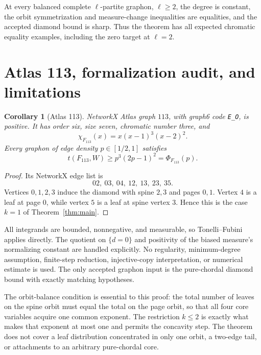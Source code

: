 \documentclass[11pt]{article}
\newtheorem{corollary}[theorem]{Corollary}
\begin{document}
At every balanced complete $\ell$-partite graphon, $\ell\geq2$, the degree
is constant, the orbit symmetrization and measure-change inequalities are
equalities, and the accepted diamond bound is sharp.  Thus the theorem has
all expected chromatic equality examples, including the zero target at
$\ell=2$.


\section{Atlas 113, formalization audit, and limitations}

\begin{corollary}[Atlas 113]
NetworkX Atlas graph $113$, with graph6 code \texttt{E\_O}, is
positive.  It has order six, size seven, chromatic number three, and
\[
 \chi_{F_{113}}(x)=x(x-1)^3(x-2)^2.
\]
Every graphon of edge density $p\in[1/2,1]$ satisfies
\[
 t(F_{113},W)\geq p^3(2p-1)^2=\Phi_{F_{113}}(p).
\]
\end{corollary}

\begin{proof}
Its NetworkX edge list is
\[
 02,\ 03,\ 04,\ 12,\ 13,\ 23,\ 35.
\]
Vertices $0,1,2,3$ induce the diamond with spine $2,3$ and pages $0,1$.
Vertex $4$ is a leaf at page $0$, while vertex $5$ is a leaf at spine
vertex $3$.  Hence this is the case $k=1$ of Theorem~\ref{thm:main}.
\end{proof}

All integrands are bounded, nonnegative, and measurable, so Tonelli--Fubini
applies directly.  The quotient on $\{d=0\}$ and positivity of the biased
measure's normalizing constant are handled explicitly.  No regularity,
minimum-degree assumption, finite-step reduction, injective-copy
interpretation, or numerical estimate is used.  The only accepted graphon
input is the pure-chordal diamond bound with exactly matching hypotheses.

The orbit-balance condition is essential to this proof: the total number of
leaves on the spine orbit must equal the total on the page orbit, so that all
four core variables acquire one common exponent.  The restriction $k\leq2$
is exactly what makes that exponent at most one and permits the concavity
step.  The theorem does not cover a leaf distribution concentrated in only
one orbit, a two-edge tail, or attachments to an arbitrary pure-chordal core.
\end{document}
